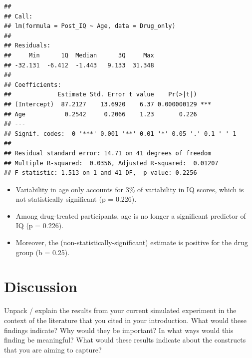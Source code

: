 \documentclass[
]{book}
\newenvironment{Shaded}{\begin{snugshade}}{\end{snugshade}}
\newcommand{\AttributeTok}[1]{\textcolor[rgb]{0.13,0.29,0.53}{#1}}
\newcommand{\DocumentationTok}[1]{\textcolor[rgb]{0.56,0.35,0.01}{\textbf{\textit{#1}}}}
\newcommand{\FunctionTok}[1]{\textcolor[rgb]{0.13,0.29,0.53}{\textbf{#1}}}
\newcommand{\NormalTok}[1]{#1}
\newcommand{\OtherTok}[1]{\textcolor[rgb]{0.56,0.35,0.01}{#1}}
\newcommand{\SpecialCharTok}[1]{\textcolor[rgb]{0.81,0.36,0.00}{\textbf{#1}}}
\newcommand{\StringTok}[1]{\textcolor[rgb]{0.31,0.60,0.02}{#1}}
\providecommand{\tightlist}{%
  \setlength{\itemsep}{0pt}\setlength{\parskip}{0pt}}
\begin{document}
\begin{Shaded}
\end{Shaded}

\begin{verbatim}
## 
## Call:
## lm(formula = Post_IQ ~ Age, data = Drug_only)
## 
## Residuals:
##     Min      1Q  Median      3Q     Max 
## -32.131  -6.412  -1.443   9.133  31.348 
## 
## Coefficients:
##             Estimate Std. Error t value    Pr(>|t|)    
## (Intercept)  87.2127    13.6920    6.37 0.000000129 ***
## Age           0.2542     0.2066    1.23       0.226    
## ---
## Signif. codes:  0 '***' 0.001 '**' 0.01 '*' 0.05 '.' 0.1 ' ' 1
## 
## Residual standard error: 14.71 on 41 degrees of freedom
## Multiple R-squared:  0.0356, Adjusted R-squared:  0.01207 
## F-statistic: 1.513 on 1 and 41 DF,  p-value: 0.2256
\end{verbatim}

\begin{itemize}
\tightlist
\item
  Variability in age only accounts for 3\% of variability in IQ scores, which is not statistically significant (p = 0.226).
\item
  Among drug-treated participants, age is no longer a significant predictor of IQ (p = 0.226).
\item
  Moreover, the (non-statistically-significant) estimate is positive for the drug group (b = 0.25).
\end{itemize}

\section*{Discussion}\label{discussion}

Unpack / explain the results from your current simulated experiment in the context of the literature that you cited in your introduction. What would these findings indicate? Why would they be important? In what ways would this finding be meaningful? What would these results indicate about the constructs that you are aiming to capture?
\end{document}
